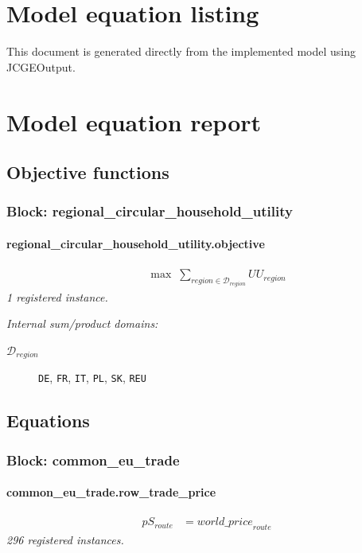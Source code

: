 \documentclass[11pt]{article}
\begin{document}
\section*{Model equation listing}

This document is generated directly from the implemented model using JCGEOutput.

\section*{Model equation report}
\subsection*{Objective functions}
\subsubsection*{Block: regional\_circular\_household\_utility}
\paragraph{regional\_circular\_household\_utility.objective}
\begin{align*}
&\quad \max\;\sum_{region \in \mathcal{D}_{region}} UU_{region}
\end{align*}
\noindent\emph{1 registered instance.}\par
\noindent\emph{Internal sum/product domains:}\par
\begin{description}
\item[\(\mathcal{D}_{region}\)] \texttt{DE}, \texttt{FR}, \texttt{IT}, \texttt{PL}, \texttt{SK}, \texttt{REU}
\end{description}
\subsection*{Equations}
\subsubsection*{Block: common\_eu\_trade}
\paragraph{common\_eu\_trade.row\_trade\_price}
\begin{align*}
pS_{route} &= {world\_price}_{route}
\end{align*}
\noindent\emph{296 registered instances.}\par
\end{document}
